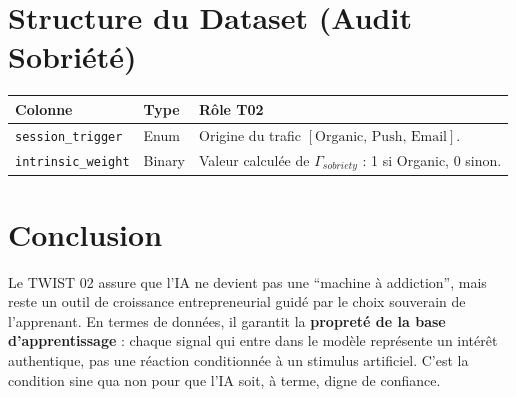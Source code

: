 \documentclass[11pt,a4paper]{article}
\begin{document}
\section{Structure du Dataset (Audit Sobriété)}
\begin{table}[h!]
\centering
\begin{tabular}{|l|l|p{7cm}|}
\hline
\rowcolor{BrandDark} \color{white} Colonne & \rowcolor{BrandDark} \color{white} Type & \rowcolor{BrandDark} \color{white} Rôle T02 \\ \hline
\texttt{session\_trigger} & Enum & Origine du trafic $[\text{Organic, Push, Email}]$. \\ \hline
\texttt{intrinsic\_weight} & Binary & Valeur calculée de $\Gamma_{sobriety}$ : 1 si Organic, 0 sinon. \\ \hline
\end{tabular}
\end{table}

\section{Conclusion}
Le TWIST 02 assure que l'IA ne devient pas une ``machine à addiction'', mais reste un outil de croissance entrepreneurial guidé par le choix souverain de l'apprenant. En termes de données, il garantit la \textbf{propreté de la base d'apprentissage} : chaque signal qui entre dans le modèle représente un intérêt authentique, pas une réaction conditionnée à un stimulus artificiel. C'est la condition sine qua non pour que l'IA soit, à terme, digne de confiance.
\end{document}
